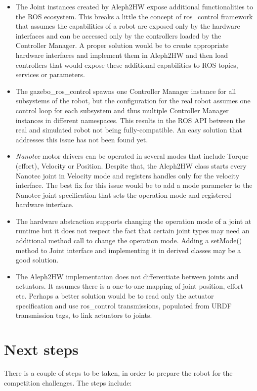 \documentclass[english,inz,shortabstract]{iithesis}
\begin{document}
\begin{itemize}
	\item The \textsf{Joint} instances created by \textsf{Aleph2HW} expose additional functionalities to the ROS ecosystem. This breaks a little the concept of \textsf{ros\_control} framework that assumes the capabilities of a robot are exposed only by the hardware interfaces and can be accessed only by the controllers loaded by the Controller Manager. A proper solution would be to create appropriate hardware interfaces and implement them in \textsf{Aleph2HW} and then load controllers that would expose these additional capabilities to ROS topics, services or parameters.  
	\item The \textsf{gazebo\_ros\_control} spawns one Controller Manager instance for all subsystems of the robot, but the configuration for the real robot assumes one control loop for each subsystem and thus multiple Controller Manager instances in different namespaces. This results in the ROS API between the real and simulated robot not being fully-compatible. An easy solution that addresses this issue has not been found yet.
	\item \textit{Nanotec} motor drivers can be operated in several modes that include Torque (effort), Velocity or Position. Despite that, the \textsf{Aleph2HW} class starts every \textsf{Nanotec} joint in Velocity mode and registers handles only for the velocity interface. The best fix for this issue would be to add a \textsf{mode} parameter to the \textsf{Nanotec} joint specification that sets the operation mode and registered hardware interface.
	\item The hardware abstraction supports changing the operation mode of a joint at runtime but it does not respect the fact that certain joint types may need an additional method call to change the operation mode. Adding a \textsf{setMode()} method to \textsf{Joint} interface and implementing it in derived classes may be a good solution.
	\item The \textsf{Aleph2HW} implementation does not differentiate between joints and actuators. It assumes there is a one-to-one mapping of joint position, effort etc. Perhaps a better solution would be to read only the actuator specification and use \textsf{ros\_control} transmissions, populated from URDF \textsf{transmission} tags, to link actuators to joints.
\end{itemize}

\section{Next steps}
There is a couple of steps to be taken, in order to prepare the robot for the competition challenges. The steps include:
\end{document}
